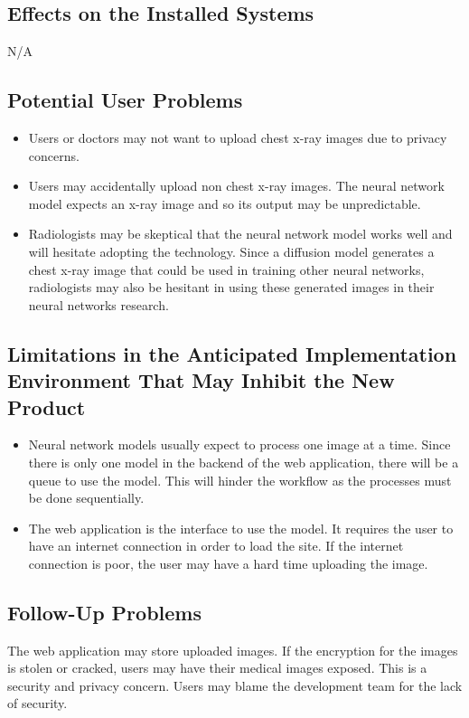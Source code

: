 \documentclass[12pt]{article}
\begin{document}
\subsection{Effects on the Installed Systems}
N/A 

\subsection{Potential User Problems}
\begin{itemize}
    \item Users or doctors may not want to upload chest x-ray images due to privacy concerns.
    \item Users may accidentally upload non chest x-ray images. The neural network model expects 
    an x-ray image and so its output may be unpredictable.
    \item Radiologists may be skeptical that the neural network model works well and will hesitate 
    adopting the technology. Since a diffusion model generates a chest x-ray image that could be 
    used in training other neural networks, radiologists may also be hesitant in using these 
    generated images in their neural networks research.
\end{itemize}

\subsection{Limitations in the Anticipated Implementation Environment That May
Inhibit the New Product}
\begin{itemize}
    \item Neural network models usually expect to process one image at a time. Since there is only 
    one model in the backend of the web application, there will be a queue to use the model. This 
    will hinder the workflow as the processes must be done sequentially.
    \item The web application is the interface to use the model. It requires the user to have an 
    internet connection in order to load the site. If the internet connection is poor, the user 
    may have a hard time uploading the image.
\end{itemize}

\subsection{Follow-Up Problems}
The web application may store uploaded images. If the encryption for the images is stolen or 
cracked, users may have their medical images exposed. This is a security and privacy concern. 
Users may blame the development team for the lack of security.
\end{document}
